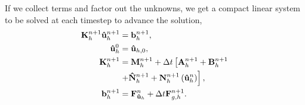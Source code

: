 \documentclass[../../thesis.tex]{subfiles}
\newcommand{\dt}{\ensuremath{\Delta t}}
\newcommand{\Ah}[1]{\ensuremath{\vb{#1}^{n+1}_h}}
\begin{document}
If we collect terms and factor out the unknowns, we get a compact linear system to be solved at each timestep to advance the solution,
\begin{subequations}
    \begin{align}
        \label{eq:1d_fom_linear_system_timestep}
        \vb{K}_h^{n+1} \vb{\hat{u}}_h^{n+1} &= \vb{b}_h^{n+1}, 
        \\
        \vb{\hat{u}}_h^{0} &= \vb{\hat{u}}_{h,0},
        \\
        \vb{K}_h^{n+1} &= \Ah{M} + \dt \left[\Ah{A} + \Ah{B} \right. 
        \nonumber 
        \\
                        &\left. + \Ah{\hat{N}} + \Ah{N}\left(\vb{\hat{u}}_{h}^{n}\right)\right],
        \\
        \vb{b}_h^{n+1} &= \vb{F}_{\vb{\hat{u}}_h}^{n} + \dt \vb{F}_{g,h}^{n+1}.
    \end{align}
\end{subequations}



\end{document}
